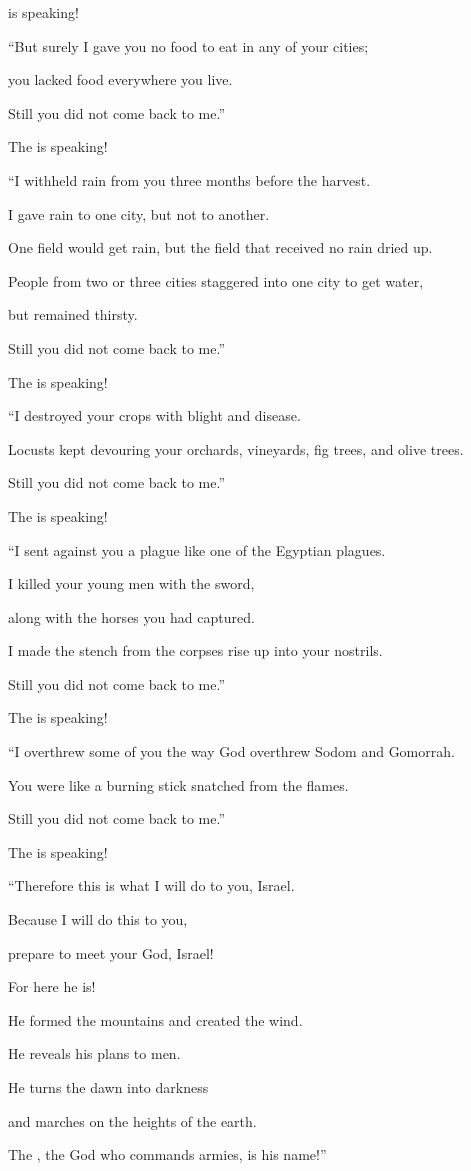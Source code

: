 {{}
is speaking!
\par }{\Q {}“But surely I
gave
you no food to eat
in any
of your cities;
\par }{\Q you lacked
food
everywhere
you live.
\par }{\Q Still you did not
come back
to
me.”
\par }{\Q The
{}
is speaking!
\par }{\Q {}“I
withheld
rain
from
you three
months
before
the harvest.
\par }{\Q I gave rain
to one
city,
but not
to another.
\par }{\Q One
field
would get rain,
but the field
that
received no
rain
dried up.
\par }{\Q {}People from two
or three
cities
staggered
into
one
city
to get
water,
\par }{\Q but remained thirsty.
\par }{\Q Still you did not
come back
to me.”
\par }{\Q The
{}
is speaking!
\par }{\Q {}“I destroyed
your crops with blight
and disease.
\par }{\Q Locusts
kept devouring
your orchards,
vineyards,
fig trees,
and olive
trees.
\par }{\Q Still you did not
come back
to me.”
\par }{\Q The
{}
is speaking!
\par }{\Q {}“I sent
against you a plague
like
one of the Egyptian
plagues.
\par }{\Q I killed
your young men
with
the sword,
\par }{\Q along with
the horses
you had captured.
\par }{\Q I made the stench
from the corpses
rise up
into
your nostrils.
\par }{\Q Still you did not
come back
to me.”
\par }{\Q The
{}
is speaking!
\par }{\Q {}“I overthrew
some of you the way God
overthrew
Sodom
and Gomorrah.
\par }{\Q You were
like a burning stick snatched
from
the flames.
\par }{\Q Still you did not
come back
to me.”
\par }{\Q The
{}
is speaking!
\par }{\Q {}“Therefore
this is what
I will do
to you, Israel.
\par }{\Q Because
I will do
this
to you,
\par }{\Q prepare
to meet
your God,
Israel!
\par }{\Q {}For
here
he is!
\par }{\Q He formed
the mountains
and created
the wind.
\par }{\Q He reveals
his plans to men.
\par }{\Q He turns the dawn
into darkness
\par }{\Q and marches
on
the heights
of the earth.
\par }{\Q The
{}, the God
who commands armies,
is his name!”

}
